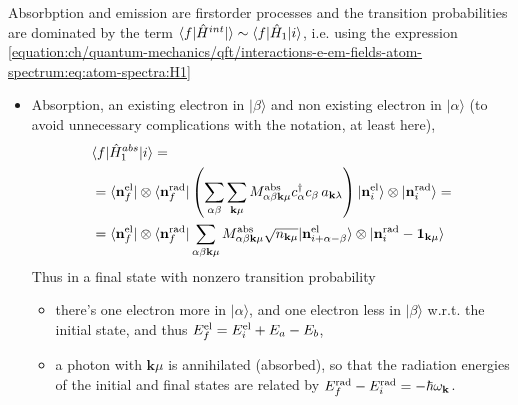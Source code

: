 \documentclass[letterpaper,10pt,english]{jupyterBook}
\begin{document}
\sphinxAtStartPar
Absorbption and emission are first\sphinxhyphen{}order processes and the transition probabilities are dominated by the term \(\langle f | \hat{H}^{int} | \rangle \sim \langle f | \hat{H}_{\rm 1} | i \rangle\), i.e. using the expression \eqref{equation:ch/quantum-mechanics/qft/interactions-e-em-fields-atom-spectrum:eq:atom-spectra:H1}
\begin{itemize}
\item {} 
\sphinxAtStartPar
Absorption,  an existing electron in \(| \beta \rangle\) and non existing electron in \(| \alpha \rangle\) (to avoid unnecessary complications with the notation, at least here),
\begin{equation*}
\begin{split}\begin{aligned}
     & \langle f | \hat{H}^{abs}_{\rm 1} | i \rangle = \\
     & = \langle \mathbf{n}^{\rm el}_f | \otimes \langle \mathbf{n}_f^{\rm rad} | \left( \sum_{\alpha\beta}\sum_{\mathbf k \mu} M_{\alpha \beta \mathbf{k} \mu}^{\rm abs} c_\alpha^\dagger c_\beta\,a_{\mathbf k\lambda}  \right)  | \mathbf{n}^{\rm el}_i \rangle \otimes | \mathbf{n}_i^{\rm rad} \rangle = \\
     & = \langle \mathbf{n}^{\rm el}_f | \otimes \langle \mathbf{n}_f^{\rm rad} | \sum_{\alpha\beta \mathbf{k} \mu} M_{\alpha \beta \mathbf{k} \mu}^{\rm abs} \sqrt{n_{\mathbf{k}\mu}} | \mathbf{n}^{\rm el}_{i+\alpha-\beta} \rangle \otimes | \mathbf{n}^{\rm rad}_i - \mathbf{1}_{\mathbf{k}\mu} \rangle 
   \end{aligned}\end{split}
\end{equation*}
\sphinxAtStartPar
Thus in a final state with non\sphinxhyphen{}zero transition probability
\begin{itemize}
\item {} 
\sphinxAtStartPar
there’s one electron more in \(| \alpha \rangle\), and one electron less in \(| \beta \rangle\) w.r.t. the initial state, and thus \(E^{\rm el}_f = E^{\rm el}_i + E_a - E_b\),

\item {} 
\sphinxAtStartPar
a photon with \(\mathbf{k} \mu\) is annihilated (absorbed), so that the radiation energies of the initial and final states are related by \(E_f^{\rm rad} - E_i^{\rm rad} = - \hbar \omega_{\mathbf{k}}\).

\end{itemize}


\end{itemize}
\end{document}
